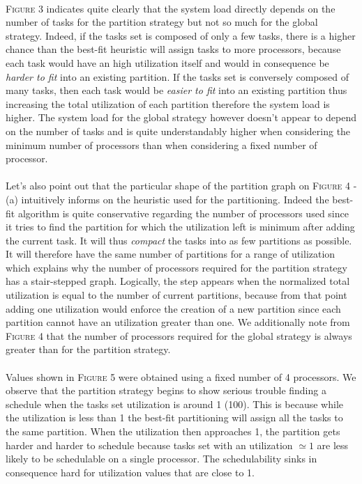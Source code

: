 \documentclass[a4paper]{article}
\begin{document}
\paragraph{}
\textsc{Figure 3} indicates quite clearly that the system load directly depends on the number of tasks for the partition strategy but not so much for the global strategy. Indeed, if the tasks set is composed of only a few tasks, there is a higher chance than the best-fit heuristic will assign tasks to more processors, because each task would have an high utilization itself and would in consequence be \textit{harder to fit} into an existing partition. If the tasks set is conversely composed of many tasks, then each task would be \textit{easier to fit} into an existing partition thus increasing the total utilization of each partition therefore the system load is higher. The system load for the global strategy however doesn't appear to depend on the number of tasks and is quite understandably higher when considering the minimum number of processors than when considering a fixed number of processor. 
\paragraph{}
Let's also point out that the particular shape of the partition graph on \textsc{Figure 4} - (a) intuitively informs on the heuristic used for the partitioning. Indeed the best-fit algorithm is quite conservative regarding the number of processors used since it tries to find the partition for which the utilization left is minimum after adding the current task. It will thus \textit{compact} the tasks into as few partitions as possible. It will therefore have the same number of partitions for a range of utilization which explains why the number of processors required for the partition strategy has a stair-stepped graph. Logically, the step appears when the normalized total utilization is equal to the number of current partitions, because from that point adding one utilization would enforce the creation of a new partition since each partition cannot have an utilization greater than one. We additionally note from \textsc{Figure 4} that the number of processors required for the global strategy is always greater than for the partition strategy. 
\paragraph{}
Values shown in \textsc{Figure 5} were obtained using a fixed number of 4 processors. We observe that the partition strategy begins to show serious trouble finding a schedule when the tasks set utilization is around 1 (100). This is because while the utilization is less than 1 the best-fit partitioning will assign all the tasks to the same partition. When the utilization then approaches 1, the partition gets harder and harder to schedule because tasks set with an utilization $\simeq 1$ are less likely to be schedulable on a single processor. The schedulability sinks in consequence hard for utilization values that are close to 1. 
\end{document}
